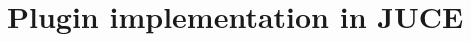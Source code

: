\documentclass[a4paper,12pt]{report}
\begin{document}

\section{Plugin implementation in JUCE}
\end{document}
